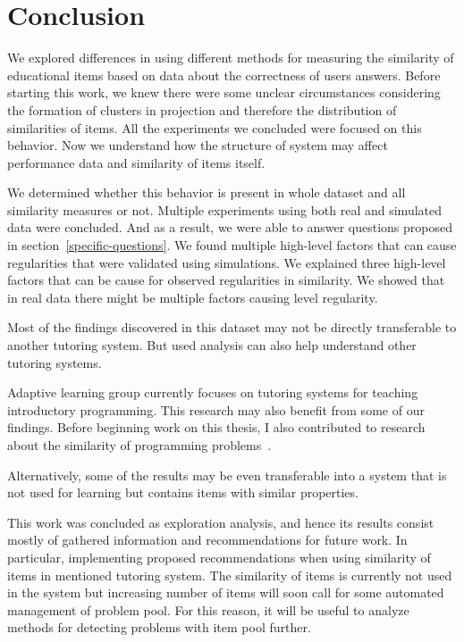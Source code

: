 \documentclass[
  printed, %
  table,   %
  nolof,     %
  nolot,     %
  color,
  final,
  nocover
]{fithesis3}
\begin{document}
\chapter{Conclusion}


We explored differences in using different methods for measuring the similarity of educational items based on data about the correctness of users answers. Before starting this work, we knew there were some unclear circumstances considering the formation of clusters in projection and therefore the distribution of similarities of items. All the experiments we concluded were focused on this behavior. Now we understand how the structure of system may affect performance data and similarity of items itself.

We determined whether this behavior is present in whole dataset and all similarity measures or not. Multiple experiments using both real and simulated data were concluded. And as a result, we were able to answer questions proposed in section~\ref{specific-questions}. We found multiple high-level factors that can cause regularities that were validated using simulations. We explained three high-level factors that can be cause for observed regularities in similarity. We showed that in real data there might be multiple factors causing level regularity.

Most of the findings discovered in this dataset may not be directly transferable to another tutoring system. But used analysis can also help understand other tutoring systems.


Adaptive learning group currently focuses on tutoring systems for teaching introductory programming. This research may also benefit from some of our findings. Before beginning work on this thesis, I also contributed to research about the similarity of programming problems~\cite{pelanek2018programming}.

Alternatively, some of the results may be even transferable into a system that is not used for learning but contains items with similar properties.


This work was concluded as exploration analysis, and hence its results consist mostly of gathered information and recommendations for future work. In particular, implementing proposed recommendations when using similarity of items in mentioned tutoring system. The similarity of items is currently not used in the system \umimeCesky{} but increasing number of items will soon call for some automated management of problem pool. For this reason, it will be useful to analyze methods for detecting problems with item pool further.
\end{document}
